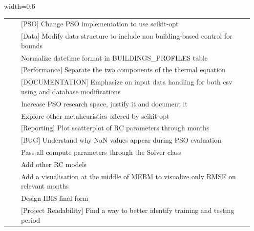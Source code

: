 \begin{table}[H]
\begin{adjustbox}{width=0.6\textwidth}
\begin{tabular}{p{5cm}p{5cm}p{8cm}}
                &
                &
                    {[PSO]} Change PSO implementation to use scikit-opt \\

                &
                &
                    {[Data]} Modify data structure to include non building-based control for bounds \\

                &
                &
                Normalize datetime format in BUILDINGS\_PROFILES table \\

                &
                &
                    {[Performance]} Separate the two components of the thermal equation \\

                &
                &
                    {[DOCUMENTATION]} Emphasize on input data handling for both csv using and database modifications \\

                &
                &
                Increase PSO research space, justify it and document it \\

                &
                &
                Explore other metaheuristics offered by scikit-opt \\

                &
                &
                    {[Reporting]} Plot scatterplot of RC parameters through months \\

                &
                &
                    {[BUG]} Understand why NaN values appear during PSO evaluation \\

                &
                &
                Pass all compute parameters through the Solver class \\

                &
                &
                Add other RC models \\

                &
                &
                Add a visualisation at the middle of MEBM to visualize only RMSE on relevant months \\

                &
                &
                Design IBIS final form \\

                &
                &
                    {[Project Readability]} Find a way to better identify training and testing period \\


\end{tabular}
\end{adjustbox}
\end{table}
